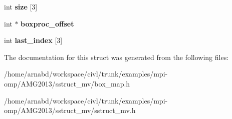 \begin{DoxyCompactItemize}
\item 
\hypertarget{structhypre__BoxMap_aba4dfe8994237976e1eb337909bf6d02}{}int {\bfseries size} \mbox{[}3\mbox{]}\label{structhypre__BoxMap_aba4dfe8994237976e1eb337909bf6d02}

\item 
\hypertarget{structhypre__BoxMap_a40b9a29f0975cf5287b755576606d35c}{}int $\ast$ {\bfseries boxproc\+\_\+offset}\label{structhypre__BoxMap_a40b9a29f0975cf5287b755576606d35c}

\item 
\hypertarget{structhypre__BoxMap_a27e3e94f3aa4e8f0fb1008a1f9eb426d}{}int {\bfseries last\+\_\+index} \mbox{[}3\mbox{]}\label{structhypre__BoxMap_a27e3e94f3aa4e8f0fb1008a1f9eb426d}

\end{DoxyCompactItemize}


The documentation for this struct was generated from the following files\+:\begin{DoxyCompactItemize}
\item 
/home/arnabd/workspace/civl/trunk/examples/mpi-\/omp/\+A\+M\+G2013/sstruct\+\_\+mv/box\+\_\+map.\+h\item 
/home/arnabd/workspace/civl/trunk/examples/mpi-\/omp/\+A\+M\+G2013/sstruct\+\_\+mv/sstruct\+\_\+mv.\+h\end{DoxyCompactItemize}
